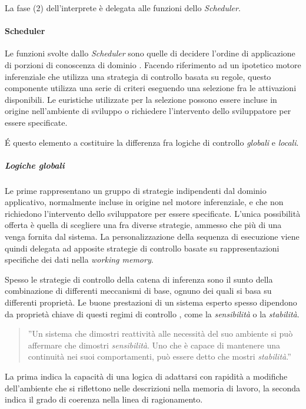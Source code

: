 La fase (2) dell'interprete è delegata alle funzioni dello \emph{Scheduler}. 

\paragraph{Scheduler} Le funzioni svolte dallo \emph{Scheduler} sono quelle di decidere l'ordine di applicazione di porzioni di conoscenza di dominio \cite{development1993}. Facendo riferimento ad un ipotetico motore inferenziale che utilizza una strategia di controllo basata su regole, questo componente utilizza una serie di criteri eseguendo una selezione fra le attivazioni disponibili. Le euristiche utilizzate per la selezione possono essere incluse in origine nell'ambiente di sviluppo o richiedere l'intervento dello sviluppatore per essere specificate.

\'E questo elemento a costituire la differenza fra logiche di controllo \emph{globali} e \emph{locali}. 

\subparagraph{Logiche globali} Le prime rappresentano un gruppo di strategie indipendenti dal dominio applicativo, normalmente incluse in origine nel motore inferenziale, e che non richiedono l'intervento dello sviluppatore per essere specificate. L'unica possibilità offerta è quella di scegliere una fra diverse strategie, ammesso che più di una venga fornita dal sistema. La personalizzazione della sequenza di esecuzione viene quindi delegata ad apposite strategie di controllo basate su rappresentazioni specifiche dei dati nella \emph{working memory}.

Spesso le strategie di controllo della catena di inferenza sono il sunto della combinazione di differenti meccanismi di base, ognuno dei quali si basa su differenti proprietà. Le buone prestazioni di un sistema esperto spesso dipendono da proprietà chiave di questi regimi di controllo \cite{jackson1999}, come la \emph{sensibilità} o la \emph{stabilità}.
\begin{quote}
	''Un sistema che dimostri reattività alle necessità del suo ambiente si può affermare che dimostri \emph{sensibilità}. Uno che è capace di mantenere una continuità nei suoi comportamenti, può essere detto che mostri \emph{stabilità}.''~\cite{McDermott:1977:PSC:1045343.1045364}
\end{quote} 
La prima indica la capacità di una logica di adattarsi con rapidità a modifiche dell'ambiente che si riflettono nelle descrizioni nella memoria di lavoro, la seconda indica il grado di coerenza nella linea di ragionamento.~\cite{jackson1999}

